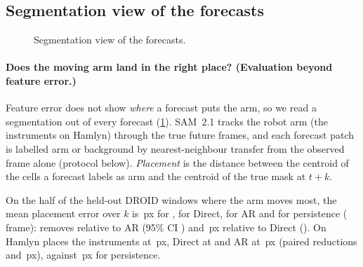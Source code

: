 \FloatBarrier
\subsection{Segmentation view of the forecasts}\label{app:segments}
\begin{figure}[h]
  \centering
  \caption[Segmentation view of the forecasts]{\ifdefined\segCaption\segCaption\else Segmentation view of the forecasts.\fi}
  \label{fig:segments}
\end{figure}

\paragraph{Does the moving arm land in the right place? (Evaluation beyond feature error.)} Feature error does not show \emph{where} a forecast puts the
arm, so we read a segmentation out of every forecast (\cref{fig:segments}). SAM~2.1 \citep{ravi2025sam2} tracks the robot
arm (the instruments on Hamlyn) through the true future frames, and each forecast patch is labelled arm or background by
nearest-neighbour transfer from the observed frame alone (protocol below). \emph{Placement} is the distance between the
centroid of the cells a forecast labels as arm and the centroid of the true mask at $t{+}k$.

On the half of the
\segDroidWindows{} held-out DROID windows where the arm moves most, the mean placement error over $k$ is
\segDroidPlaceSW{}\,px for \ours{}, \segDroidPlaceDi{} for Direct, \segDroidPlaceAR{} for AR and \segDroidPlacePers{} for
persistence (\segDroidPlaceFrame{} frame): \ours{} removes  relative to AR (95\% CI
\segDroidPlaceRedARCI{}) and \segDroidPlaceRedDi{}\,px relative to Direct (\segDroidPlaceRedDiCI{}). On Hamlyn
\ours{} places the instruments at \segHamlynPlaceSW{}\,px, Direct at \segHamlynPlaceDi{} and AR at \segHamlynPlaceAR{}\,px
(paired reductions \segHamlynPlaceRedDi{} \segHamlynPlaceRedDiCI{} and \segHamlynPlaceRedAR{} \segHamlynPlaceRedARCI{}\,px),
against \segHamlynPlacePers{}\,px for persistence.


